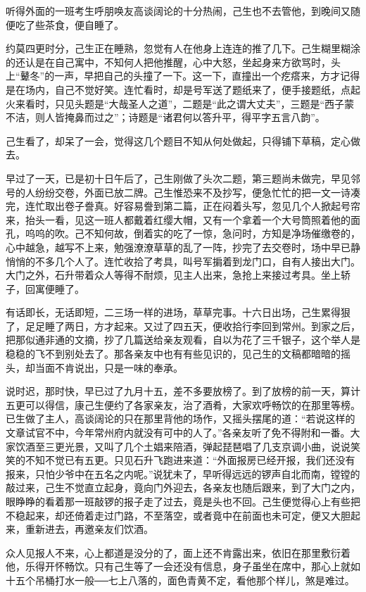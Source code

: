 \documentclass[12pt,UTF8]{ctexbook}
\begin{document}
{{{听得外面的一班考生呼朋唤友高谈阔论的十分热闹，己生也不去管他，到晚间又随便吃了些茶食，便自睡了。

约莫四更时分，己生正在睡熟，忽觉有人在他身上连连的推了几下。己生糊里糊涂的还认是在自己寓中，不知何人把他推醒，心中大怒，坐起身来方欲骂时，头上“鼙冬”的一声，早把自己的头撞了一下。这一下，直撞出一个疙瘩来，方才记得是在场内，自己不觉好笑。连忙看时，却是号军送了题纸来了，便手接题纸，点起火来看时，只见头题是“大哉圣人之道”，二题是“此之谓大丈夫”，三题是“西子蒙不洁，则人皆掩鼻而过之”；诗题是“诸君何以答升平，得平字五言八韵”。

己生看了，却呆了一会，觉得这几个题目不知从何处做起，只得铺下草稿，定心做去。

早过了一天，已是初十日午后了，己生刚做了头次二题，第三题尚未做完，早见邻号的人纷纷交卷，外面已放二牌。己生惟恐来不及抄写，便急忙忙的把一文一诗凑完，连忙取出卷子誊真。好容易誊到第二篇，正在闷着头写，忽见几个人掀起号帘来，抬头一看，见这一班人都戴着红缨大帽，又有一个拿着一个大号筒照着他的面孔，呜呜的吹。己不知何故，倒着实的吃了一惊，急问时，方知是净场催缴卷的，心中越急，越写不上来，勉强潦潦草草的乱了一阵，抄完了去交卷时，场中早已静悄悄的不多几个人了。连忙收拾了考具，叫号军掮着到龙门口，自有人接出大门。大门之外，石升带着众人等得不耐烦，见主人出来，急抢上来接过考具。坐上轿子，回寓便睡了。

有话即长，无话即短，二三场一样的进场，草草完事。十六日出场，己生累得狠了，足足睡了两日，方才起来。又过了四五天，便收拾行李回到常州。到家之后，把那似通非通的文摘，抄了几篇送给亲友观看，自以为花了三千银子，这个举人是稳稳的飞不到别处去了。那各亲友中也有有些见识的，见己生的文稿都暗暗的摇头，却当面不肯说出，只是一味的奉承。

说时迟，那时快，早已过了九月十五，差不多要放榜了。到了放榜的前一天，算计五更可以得信，康己生便约了各家亲友，治了酒肴，大家欢呼畅饮的在那里等榜。已生做了主人，高谈阔论的只在那里背他的场作，又摇头摆尾的道：“若说这样的文章试官不中，今年常州府内就没有可中的人了。”各亲友听了免不得附和一番。大家饮酒至三更光景，又叫了几个土娼来陪酒，弹起琵琶唱了几支京调小曲，说说笑笑的不知不觉已有五更。只见石升飞跑进来道：“外面报房已经开报，我们还没有报来，只怕少爷中在五名之内呢。”说犹未了，早听得远远的锣声自北而南，镗镗的敲过来，己生不觉直立起身，竟向门外迎去，各亲友也随后跟来，到了大门之内，眼睁睁的看着那一班敲锣的报子走了过去，竟是头也不回。己生便觉得心上有些把不稳起来，却还倚着走过门路，不至落空，或者竟中在前面也未可定，便又大胆起来，重新进去，再邀亲友们饮酒。

众人见报人不来，心上都道是没分的了，面上还不肯露出来，依旧在那里敷衍着他，乐得开怀畅饮。只有己生等了一会还没有信息，身子虽坐在席中，那心上就如十五个吊桶打水一般──七上八落的，面色青黄不定，看他那个样儿，煞是难过。

}}}
\end{document}
